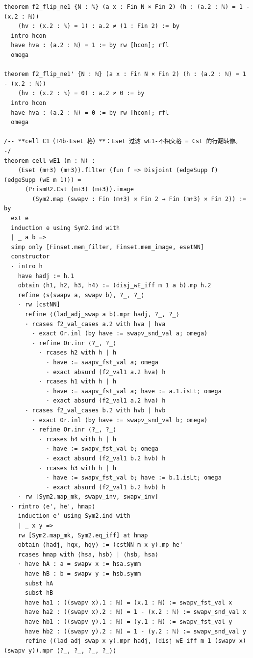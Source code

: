 \documentclass[11pt]{article}
\begin{document}
\begin{lstlisting}
theorem f2_flip_ne1 {N : ℕ} (a x : Fin N × Fin 2) (h : (a.2 : ℕ) = 1 - (x.2 : ℕ))
    (hv : (x.2 : ℕ) = 1) : a.2 ≠ (1 : Fin 2) := by
  intro hcon
  have hva : (a.2 : ℕ) = 1 := by rw [hcon]; rfl
  omega

theorem f2_flip_ne1' {N : ℕ} (a x : Fin N × Fin 2) (h : (a.2 : ℕ) = 1 - (x.2 : ℕ))
    (hv : (x.2 : ℕ) = 0) : a.2 ≠ 0 := by
  intro hcon
  have hva : (a.2 : ℕ) = 0 := by rw [hcon]; rfl
  omega

/-- **cell C1（T4b·Eset 格）**：Eset 过滤 wE1-不相交格 = Cst 的行翻转像。 -/
theorem cell_wE1 (m : ℕ) :
    (Eset (m+3) (m+3)).filter (fun f => Disjoint (edgeSupp f) (edgeSupp (wE m 1))) =
      (PrismR2.Cst (m+3) (m+3)).image
        (Sym2.map (swapv : Fin (m+3) × Fin 2 → Fin (m+3) × Fin 2)) := by
  ext e
  induction e using Sym2.ind with
  | _ a b =>
  simp only [Finset.mem_filter, Finset.mem_image, esetNN]
  constructor
  · intro h
    have hadj := h.1
    obtain ⟨h1, h2, h3, h4⟩ := (disj_wE_iff m 1 a b).mp h.2
    refine ⟨s(swapv a, swapv b), ?_, ?_⟩
    · rw [cstNN]
      refine ⟨(lad_adj_swap a b).mpr hadj, ?_, ?_⟩
      · rcases f2_val_cases a.2 with hva | hva
        · exact Or.inl (by have := swapv_snd_val a; omega)
        · refine Or.inr ⟨?_, ?_⟩
          · rcases h2 with h | h
            · have := swapv_fst_val a; omega
            · exact absurd (f2_val1 a.2 hva) h
          · rcases h1 with h | h
            · have := swapv_fst_val a; have := a.1.isLt; omega
            · exact absurd (f2_val1 a.2 hva) h
      · rcases f2_val_cases b.2 with hvb | hvb
        · exact Or.inl (by have := swapv_snd_val b; omega)
        · refine Or.inr ⟨?_, ?_⟩
          · rcases h4 with h | h
            · have := swapv_fst_val b; omega
            · exact absurd (f2_val1 b.2 hvb) h
          · rcases h3 with h | h
            · have := swapv_fst_val b; have := b.1.isLt; omega
            · exact absurd (f2_val1 b.2 hvb) h
    · rw [Sym2.map_mk, swapv_inv, swapv_inv]
  · rintro ⟨e', he', hmap⟩
    induction e' using Sym2.ind with
    | _ x y =>
    rw [Sym2.map_mk, Sym2.eq_iff] at hmap
    obtain ⟨hadj, hqx, hqy⟩ := (cstNN m x y).mp he'
    rcases hmap with ⟨hsa, hsb⟩ | ⟨hsb, hsa⟩
    · have hA : a = swapv x := hsa.symm
      have hB : b = swapv y := hsb.symm
      subst hA
      subst hB
      have ha1 : ((swapv x).1 : ℕ) = (x.1 : ℕ) := swapv_fst_val x
      have ha2 : ((swapv x).2 : ℕ) = 1 - (x.2 : ℕ) := swapv_snd_val x
      have hb1 : ((swapv y).1 : ℕ) = (y.1 : ℕ) := swapv_fst_val y
      have hb2 : ((swapv y).2 : ℕ) = 1 - (y.2 : ℕ) := swapv_snd_val y
      refine ⟨(lad_adj_swap x y).mpr hadj, (disj_wE_iff m 1 (swapv x) (swapv y)).mpr ⟨?_, ?_, ?_, ?_⟩⟩

\end{lstlisting}
\end{document}
